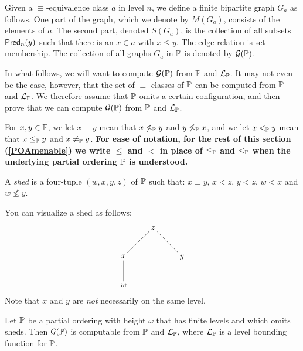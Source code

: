 Given a $\equiv$-equivalence class $a$ in level $n$, we define a finite bipartite
graph $G_{a}$ as follows.
One part of the graph, which we denote by $M(G_a)$, consists of the elements of $a$.
The second part, denoted $S(G_a)$, is the collection of all subsets $\mathsf{Pred}_n(y)$ such that
there is an $x\in a$ with $x\leq y$.
The edge relation is set membership.
The collection of all graphs $G_{a}$ in $\mathbb{P}$ is denoted by $\mathcal{G}(\mathbb{P})$.

In what follows, we will want to compute
$\mathcal{G}(\mathbb{P})$ from $\mathbb{P}$ and $\mathcal{L}_{\mathbb{P}}$.
It may not even be the case, however,
that the set of $\equiv$ classes of $\mathbb{P}$
can be computed from $\mathbb{P}$ and $\mathcal{L}_{\mathbb{P}}$.
We therefore assume that $\mathbb{P}$ omits a certain configuration,
and then prove that we can compute $\mathcal{G}(\mathbb{P})$ from $\mathbb{P}$ and $\mathcal{L}_{\mathbb{P}}$.

For $x,y\in\mathbb{P}$, we let $x\perp y$ mean that $x\not\leq_{\mathbb{P}} y$ and $y\not\leq_{\mathbb{P}} x$,
and we let $x<_{\mathbb{P}} y$ mean that $x\leq_{\mathbb{P}} y$ and $x\neq_{\mathbb{P}} y$.
\textbf{For ease of notation, for the rest of this section (\ref{POAmenable}) we
write $\leq$ and $<$ in place of $\leq_{\mathbb{P}}$ and $<_{\mathbb{P}}$ when the underlying
partial ordering $\mathbb{P}$ is understood.}

\begin{definition}
A \textit{shed} is a four-tuple $(w,x,y,z)$ of $\mathbb{P}$ such that:
$x\perp y$, $x<z$, $y<z$, $w<x$ and $w\not\leq y$.
\end{definition}
You can visualize a shed as follows:
$$\xymatrix{
  & z\ar@{-}[ld]\ar@{-}[rd] &   \\
x\ar@{-}[d] &   &  y \\
w &   &   \\
}$$
Note that $x$ and $y$ are \textit{not} necessarily on the same level.

\begin{lem}[\RCAo]
Let $\mathbb{P}$ be a partial ordering with height $\omega$
that has finite levels and which omits sheds.
Then $\mathcal{G}(\mathbb{P})$ is computable from $\mathbb{P}$ and $\mathcal{L}_{\mathbb{P}}$,
where $\mathcal{L}_{\mathbb{P}}$ is a level bounding function for $\mathbb{P}$.
\end{lem}

